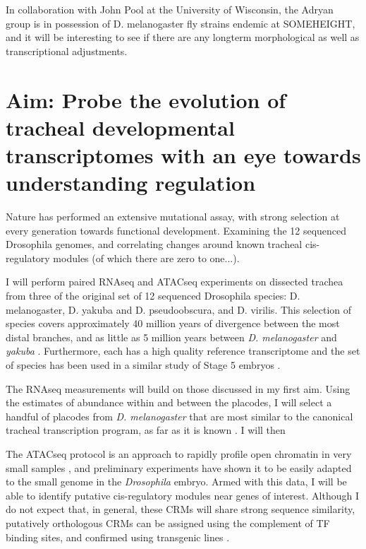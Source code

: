 \documentclass{proposal}
\begin{document}
In collaboration with John Pool at the University of Wisconsin, the Adryan group is in possession of D. melanogaster fly strains endemic at SOMEHEIGHT, and it will be interesting to see if there are any longterm morphological as well as transcriptional adjustments.

\section{Aim: Probe the evolution of tracheal developmental transcriptomes with an eye towards understanding regulation}

Nature has performed an extensive mutational assay, with strong selection at every generation towards functional development.
Examining the 12 sequenced Drosophila genomes, and correlating changes around known tracheal cis-regulatory modules (of which there are zero to one...).

I will perform paired RNAseq and ATACseq experiments on dissected trachea from three of the original set of 12 sequenced Drosophila species: D. melanogaster, D. yakuba and D. pseudoobscura, and D. virilis.
This selection of species covers approximately 40 million years of divergence between the most distal branches, and as little as 5 million years between {\em D. melanogaster} and {\em yakuba} \cite{Russo:1995ti}.
Furthermore, each has a high quality reference transcriptome and the set of species has been used in a similar study of Stage 5 embryos \cite{Paris:2013ib}.

The RNAseq measurements will build on those discussed in my first aim.
Using the estimates of abundance within and between the placodes, I will select a handful of placodes from {\em D. melanogaster} that are most similar to the canonical tracheal transcription program, as far as it is known \cite{Ghabrial:2003kz}.
I will then

The ATACseq protocol is an approach to rapidly profile open chromatin in very small samples \cite{Buenrostro:2013bc}, and preliminary experiments have shown it to be easily adapted to the small genome in the {\em Drosophila} embryo.
Armed with this data, I will be able to identify putative cis-regulatory modules near genes of interest.
Although I do not expect that, in general, these CRMs will share strong sequence similarity, putatively orthologous CRMs can be assigned using the complement of TF binding sites, and confirmed using transgenic lines \cite{Hare:2008fi}.
\end{document}
